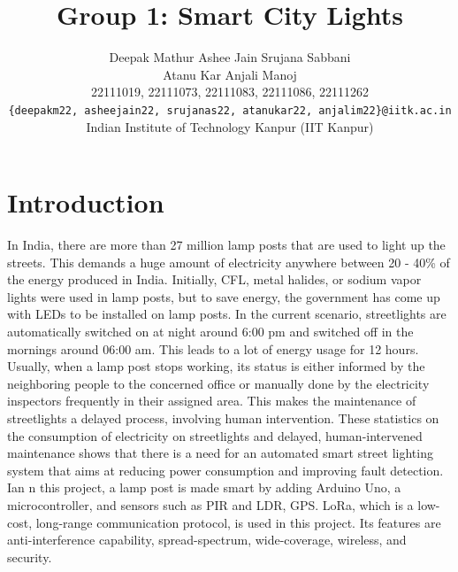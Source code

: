 \documentclass[11pt, oneside]{article}   	%
\title{Group 1: Smart City Lights}
\author{
    Deepak Mathur  \qquad   
    Ashee Jain  \qquad
    Srujana Sabbani  \\
    Atanu Kar \qquad
    Anjali Manoj \\ 
   22111019, 22111073, 22111083, 22111086, 22111262\\
   {\tt \{deepakm22, asheejain22, srujanas22, atanukar22, anjalim22\}@iitk.ac.in}\\
{Indian Institute of Technology Kanpur (IIT Kanpur)}
}
\date{}							%
\begin{document}
\maketitle

    
\section{Introduction}
In India, there are more than 27 million lamp posts that are used to light up the streets. This demands a huge amount of electricity anywhere between 20 - 40\% of 
the energy produced in India. Initially, CFL, metal halides, or sodium vapor lights were used in lamp posts, but to save energy, the government has come up with LEDs 
to be installed on lamp posts. In the current scenario, streetlights are automatically switched on at night around 6:00 pm and switched off in the mornings around 
06:00 am. This leads to a lot of energy usage for 12 hours. Usually, when a lamp post stops working, its status is either informed by the neighboring people to the concerned 
office or manually done by the electricity inspectors frequently in their assigned area. This makes the maintenance of streetlights a delayed process, involving human 
intervention. These statistics on the consumption of electricity on streetlights and delayed, human-intervened maintenance shows that there is a need for an automated smart
street lighting system that aims at reducing power consumption and improving fault detection.
Ian n this project, a lamp post is made smart by adding Arduino Uno, a microcontroller, and sensors such as PIR and LDR, GPS. LoRa, which is a low-cost, long-range communication protocol, is used in this project. Its features are anti-interference capability, spread-spectrum, wide-coverage, wireless, and security. 
\end{document}
